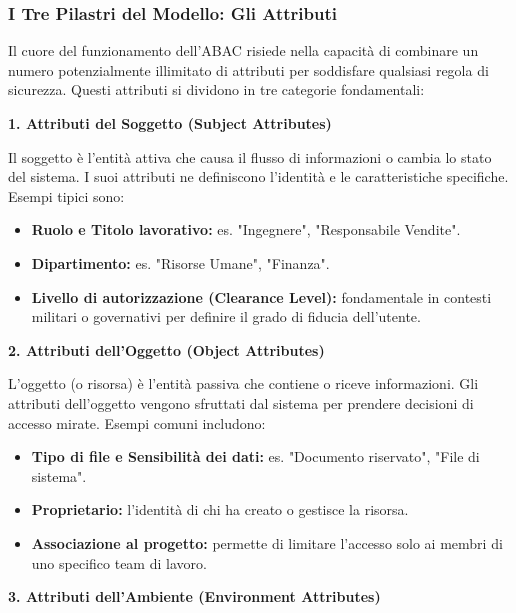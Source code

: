 \documentclass{article}
\begin{document}
\subsubsection*{I Tre Pilastri del Modello: Gli Attributi}

Il cuore del funzionamento dell'ABAC risiede nella capacità di combinare un numero potenzialmente illimitato di attributi per soddisfare qualsiasi regola di sicurezza. Questi attributi si dividono in tre categorie fondamentali:

\vspace{0.3cm}
\noindent \textbf{1. Attributi del Soggetto (Subject Attributes)}

Il soggetto è l'entità attiva che causa il flusso di informazioni o cambia lo stato del sistema. I suoi attributi ne definiscono l'identità e le caratteristiche specifiche. Esempi tipici sono:

\begin{itemize}
    \item \textbf{Ruolo e Titolo lavorativo:} es. "Ingegnere", "Responsabile Vendite".
    \item \textbf{Dipartimento:} es. "Risorse Umane", "Finanza".
    \item \textbf{Livello di autorizzazione (Clearance Level):} fondamentale in contesti militari o governativi per definire il grado di fiducia dell'utente.
\end{itemize}

\vspace{0.3cm}
\noindent \textbf{2. Attributi dell'Oggetto (Object Attributes)}

L'oggetto (o risorsa) è l'entità passiva che contiene o riceve informazioni. Gli attributi dell'oggetto vengono sfruttati dal sistema per prendere decisioni di accesso mirate. Esempi comuni includono:

\begin{itemize}
    \item \textbf{Tipo di file e Sensibilità dei dati:} es. "Documento riservato", "File di sistema".
    \item \textbf{Proprietario:} l'identità di chi ha creato o gestisce la risorsa.
    \item \textbf{Associazione al progetto:} permette di limitare l'accesso solo ai membri di uno specifico team di lavoro.
\end{itemize}

\vspace{0.3cm}
\noindent \textbf{3. Attributi dell'Ambiente (Environment Attributes)}
\end{document}
